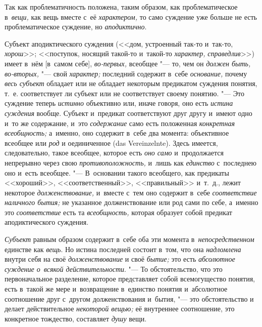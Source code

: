 \label{bkm:bm66b}Так как проблематичность положена, таким образом, как
проблематическое в~{\em вещи,} как вещь вместе с~её {\em характером,} то само
суждение уже больше не есть проблематическое суждение, но {\em аподиктично}.


Субъект аподиктического суждения (<<дом, устроенный так-то и~так-то,
{\em хорош}>>; <<поступок, носящий такой-то и~такой-то {\em характер,}
{\em справедлив}>>) имеет в~нём [в~самом себе], {\em во-первых,}
всеобщее "--- то, чем он {\em должен быть, во-вторых,} "--- свой
{\em характер;} последний содержит в~себе {\em основание,} почему
{\em весь субъект} обладает или не обладает некоторым предикатом суждения
понятия, т.~е. соответствует ли субъект или не соответствует своему
понятию. "--- Это суждение теперь {\em истинно} объективно или, иначе говоря,
оно есть {\em истина суждения} вообще. Субъект и~предикат соответствуют друг
другу и~имеют одно и~то же содержание, и~это {\em содержание} само есть
положенная {\em конкретная всеобщность;} а~именно, оно содержит в~себе два
момента: объективное всеобщее или {\em род} и
оединиченное (das Verein\-zelnte). Здесь имеется, следовательно, такое
всеобщее, которое есть {\em оно само} и~продолжается непрерывно через свою
{\em противоположность,} и~лишь как {\em единство} с~последнею оно и~есть
всеобщее. "--- В~основании такого всеобщего, как предикаты <<хороший>>,
<<соответственный>>, <<правильный>> и~т.~д., лежит некоторое
{\em долженствование,} и~вместе с~тем оно содержит в~себе {\em соответствие
наличного бытия;} не указанное долженствование или род сами по себе, а~именно
это {\em соответствие} есть та {\em всеобщность,} которая образует собой
предикат аподиктического суждения.

{\em Субъект} равным образом содержит в~себе оба эти момента
в~{\em непосредственном} единстве как {\em вещь}. Но истина последней состоит
в~том, что она {\em надломлена} внутри себя на своё {\em долженствование}
и своё {\em бытие;} это есть {\em абсолютное суждение о~всякой
действительности}. "--- То обстоятельство,
что это первоначальное разделение, которое представляет собой всемогущество
понятия, есть в~такой же мере и~возвращение в~единство понятия и~абсолютное
соотношение друг с~другом долженствования и~бытия, "--- это обстоятельство
и делает действительное {\em некоторой вещью;} её внутреннее соотношение,
это конкретное тождество, составляет {\em душу} вещи.

